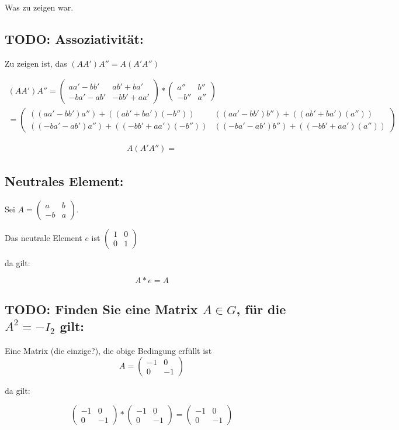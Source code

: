 \documentclass{article}
\begin{document}
Was zu zeigen war.

\subsection*{TODO: Assoziativität:}

Zu zeigen ist, das
\((AA')A''=A(A'A'')\)

\[
\begin{split}
(AA')A''
=
\begin{pmatrix}
  aa'-bb'    & ab' + ba' \\
  -ba' - ab' & -bb' + aa'
\end{pmatrix}
*
\begin{pmatrix}
  a'' & b'' \\
  -b'' & a''
\end{pmatrix}
\\
=
\begin{pmatrix}
  ((aa'-bb')a'') + ((ab' + ba')(-b'')) & ((aa'-bb')b'') + ((ab' + ba')(a'')) \\
  ((-ba'-ab')a'') + ((-bb' + aa')(-b'')) & ((-ba'-ab')b'') +  ((-bb' + aa')(a''))
\end{pmatrix}
\end{split}
\]

\[
\begin{split}
A(A'A'')
=

\end{split}
\]


\subsection*{Neutrales Element:}

Sei
\(
A=
\begin{pmatrix}
a & b \\
-b & a
\end{pmatrix}
\).

Das neutrale Element \(e\) ist
\(
\begin{pmatrix}
1 & 0 \\
0 & 1
\end{pmatrix}
\)

da gilt:

\[A * e = A\]

\subsection*{TODO: Finden Sie eine Matrix \(A \in G\), für die \(A^2=-I_{2}\) gilt:}

Eine Matrix (die einzige?), die obige Bedingung erfüllt ist
\[
A =
\begin{pmatrix}
-1 & 0 \\
0 & -1
\end{pmatrix}
\]

da gilt:

\[
\begin{pmatrix}
-1 & 0 \\
0 & -1
\end{pmatrix}
*
\begin{pmatrix}
-1 & 0 \\
0 & -1
\end{pmatrix}
=
\begin{pmatrix}
-1 & 0 \\
0 & -1
\end{pmatrix}
\]
\end{document}
